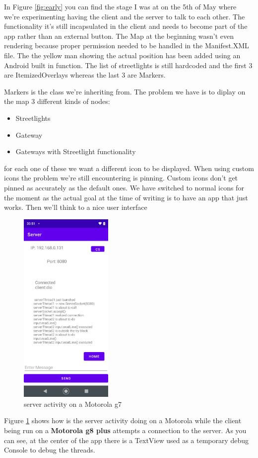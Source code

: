 \documentclass[a4paper,12pt]{book}
\begin{document}
In Figure \ref{fig:early} you can find the stage I was at on the 5th of May where we're experimenting having the client and the server to talk to each other. The functionality it's still incapsulated in the client and needs to become part of the app rather than an external button. The Map at the beginning wasn't even rendering because proper permission needed to be handled in the Manifest.XML file. The the yellow man showing the actual position has been added using an Android built in function. The list of streetlights is still hardcoded and the first 3 are ItemizedOverlays whereas the last 3 are Markers.

Markers is the class we're inheriting from. The problem we have is to diplay on the map 3 different kinds of nodes:

\bigskip

\begin{itemize}
\item Streetlights
\item Gateway
\item {Gateways with Streetlight functionality}
\end{itemize}

\bigskip
for each one of these we want a different icon to be displayed. When using custom icons the problem we're still encountering is pinning. Custom icons don't get pinned as accurately as the default ones. We have switched to normal icons for the moment as the actual goal at the time of writing is to have an app that just works. Then we'll think to a nice user interface

\clearpage


\begin{figure}
\centering
\includegraphics[width=4.5cm]{./server_g7.PNG}
\caption{server activity on a Motorola g7}\label{fig:connection-attempt}
\end{figure}
Figure \ref{fig:connection-attempt} shows how is the server activity doing on a Motorola while the client\footnotemark{} being run on a \textbf{Motorola g8 plus} attempts a connection to the server. As you can see, at the center of the app there is a TextView used as a temporary debug Console to debug the threads.
\end{document}
